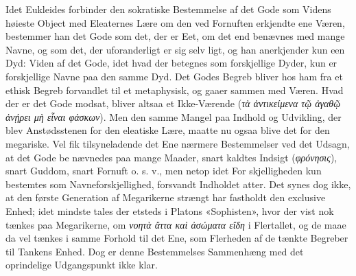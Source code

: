 \documentclass[12pt,a4paper]{book}
\newcommand{\gk}[1]{\textit{#1}}
\begin{document}
Idet Eukleides forbinder den sokratiske Bestemmelse af
det Gode som Videns høieste Object med Eleaternes Lære om
den ved Fornuften erkjendte ene Væren, bestemmer han det
Gode som det, der er Eet, om det end benævnes med mange
Navne, og som det, der uforanderligt er sig selv ligt, og han
anerkjender kun een Dyd: Viden af det Gode, idet hvad der
betegnes som forskjellige Dyder, kun er forskjellige Navne paa
den samme Dyd. Det Godes Begreb bliver hos ham fra et
ethisk Begreb forvandlet til et metaphysisk, og gaaer sammen
med Væren. Hvad der er det Gode modsat, bliver altsaa et
Ikke-Værende (\gk{τὰ ἀντικείμενα τῷ ἀγαθῷ ἀνῄρει μὴ εἶναι
φάσκων}). Men den samme Mangel paa Indhold og Udvikling,
der blev Anstødsstenen for den eleatiske Lære, maatte nu ogsaa
blive det for den megariske. Vel fik tilsyneladende det Ene
nærmere Bestemmelser ved det Udsagn, at det Gode be\-%
nævnedes paa mange Maader, snart kaldtes Indsigt (\gk{φρόνησις}),
snart Guddom, snart Fornuft o. s. v., men netop idet For\-%
skjelligheden kun bestemtes som Navneforskjellighed, forsvandt
Indholdet atter. Det synes dog ikke, at den første Generation
af Megarikerne strængt har fastholdt den exclusive Enhed; idet\-%
mindste tales der etsteds i Platons «Sophisten», hvor der vist\-%
nok tænkes paa Megarikerne, om \gk{νοητὰ ἄττα καὶ ἀσώματα
εἴδη} i Flertallet, og de maae da vel tænkes i samme Forhold
til det Ene, som Flerheden af de tænkte Begreber til Tankens
Enhed. Dog er denne Bestemmelses Sammenhæng med det
oprindelige Udgangspunkt ikke klar.
\end{document}
